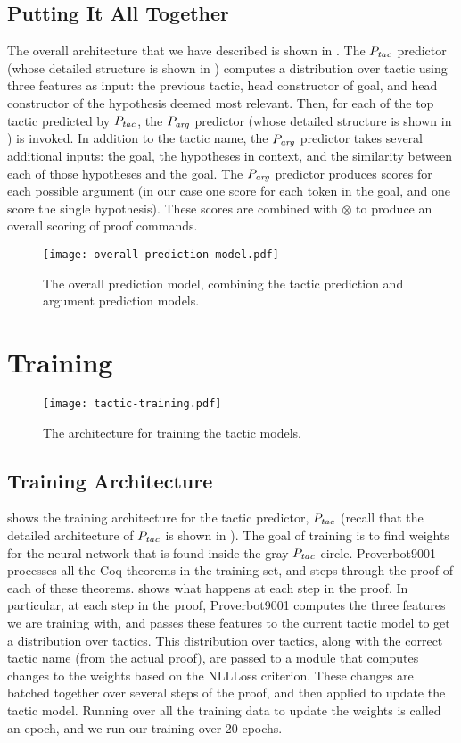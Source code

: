 \documentclass[sigplan,screen]{acmart}
\newcommand{\name}{Proverbot9001\xspace}
\newcommand{\PTac}{P_{\it tac}}
\newcommand{\PArg}{P_{\it arg}}
\newcommand{\Combine}{\otimes}
\renewcommand{\>}{\quad}
\begin{document}
\subsection{Putting It All Together}

The overall architecture that we have described is shown in .
The $\PTac$ predictor (whose detailed structure is shown in ) computes a distribution over tactic using three features as input: the previous tactic, head
constructor of goal, and head constructor of the hypothesis deemed most relevant.
Then, for each of the top tactic predicted by $\PTac$, the $\PArg$ predictor (whose detailed structure is shown in ) is invoked.
In addition to the tactic name, the $\PArg$ predictor takes several additional inputs: the goal, the hypotheses in context, and the similarity between each of those hypotheses and the goal.
The $\PArg$ predictor produces scores for each possible argument (in our case one score for each token in the goal, and one score the single hypothesis).
These scores are combined with $\Combine$ to produce an overall scoring of proof commands.

\begin{figure*}
\texttt{[image: overall-prediction-model.pdf]}
\caption{The overall prediction model, combining the tactic prediction and argument prediction models.}
\label{fig:overall-model}
\end{figure*}

\section{Training}

\begin{figure}
\texttt{[image: tactic-training.pdf]}
\caption{The architecture for training the tactic models.}
\label{fig:tactic-training}
\end{figure}
\subsection{Training Architecture}
 shows the training architecture for the tactic predictor, $\PTac$ (recall that the detailed architecture of $\PTac$ is shown in ).
The goal of training is to find weights for the neural network that is found inside the gray $\PTac$ circle.
\name{} processes all the Coq theorems in the training set, and steps through the proof of each of these theorems.
 shows what happens at each step in the proof.
In particular, at each step in the proof, \name{} computes the three features we are training with, and passes these features to the current tactic model to get a distribution over tactics.
This distribution over tactics, along with the correct tactic name (from the actual proof), are passed to a module that computes changes to the weights based on the NLLLoss criterion.
These changes are batched together over several steps of the proof, and then applied to update the tactic model.
Running over all the training data to update the weights is called an epoch, and we run our training over 20 epochs.
\end{document}
